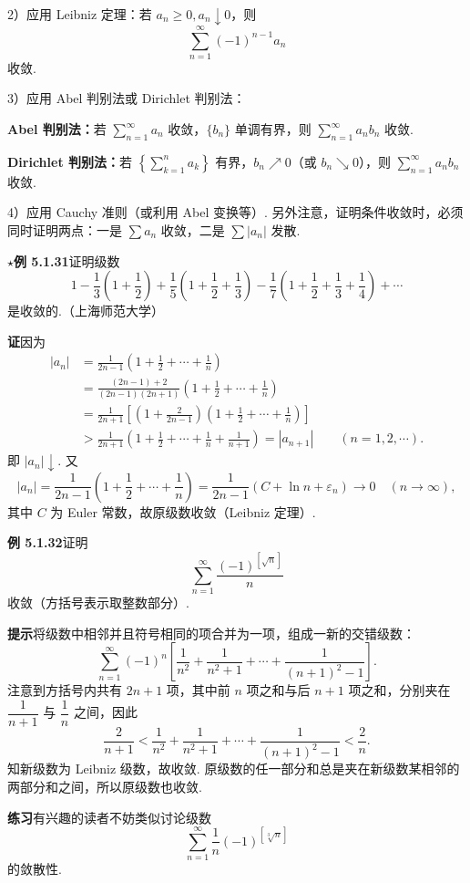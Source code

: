 \documentclass[UTF8,12pt,a4paper,fontset=fandol]{ctexart}
\begin{document}
2）应用 Leibniz 定理：若 $a_n\ge0,a_n\downarrow0$，则
\[
  \sum_{n=1}^\infty(-1)^{n-1}a_n
\]
收敛.

3）应用 Abel 判别法或 Dirichlet 判别法：

\noindent\textbf{Abel 判别法：}若 $\displaystyle\sum_{n=1}^\infty a_n$ 收敛，$\{b_n\}$ 单调有界，则 $\displaystyle\sum_{n=1}^\infty a_nb_n$ 收敛.

\noindent\textbf{Dirichlet 判别法：}若 $\left\{\displaystyle\sum_{k=1}^n a_k\right\}$ 有界，$b_n\nearrow0$（或 $b_n\searrow0$），则 $\displaystyle\sum_{n=1}^\infty a_nb_n$ 收敛.

4）应用 Cauchy 准则（或利用 Abel 变换等）. 另外注意，证明条件收敛时，必须同时证明两点：一是 $\sum a_n$ 收敛，二是 $\sum |a_n|$ 发散.

\noindent\textbf{$\star$例 5.1.31}\quad 证明级数
\[
  1-\frac13\left(1+\frac12\right)
  +\frac15\left(1+\frac12+\frac13\right)
  -\frac17\left(1+\frac12+\frac13+\frac14\right)+\cdots
\]
是收敛的.（上海师范大学）

\noindent\textbf{证}\quad 因为
\[
\begin{aligned}
|a_n|
&=\frac1{2n-1}\left(1+\frac12+\cdots+\frac1n\right)\\
&=\frac{(2n-1)+2}{(2n-1)(2n+1)}
  \left(1+\frac12+\cdots+\frac1n\right)\\
&=\frac1{2n+1}\left[\left(1+\frac2{2n-1}\right)
  \left(1+\frac12+\cdots+\frac1n\right)\right]\\
&>\frac1{2n+1}\left(1+\frac12+\cdots+\frac1n+\frac1{n+1}\right)
=|a_{n+1}|\qquad(n=1,2,\cdots).
\end{aligned}
\]
即 $|a_n|\downarrow$. 又
\[
  |a_n|=\frac1{2n-1}\left(1+\frac12+\cdots+\frac1n\right)
  =\frac1{2n-1}(C+\ln n+\varepsilon_n)\to0\quad(n\to\infty),
\]
其中 $C$ 为 Euler 常数，故原级数收敛（Leibniz 定理）.

\noindent\textbf{例 5.1.32}\quad 证明
\[
  \sum_{n=1}^{\infty}\frac{(-1)^{[\sqrt n]}}n
\]
收敛（方括号表示取整数部分）.

\noindent\textbf{提示}\quad 将级数中相邻并且符号相同的项合并为一项，组成一新的交错级数：
\[
  \sum_{n=1}^{\infty}(-1)^n
  \left[\frac1{n^2}+\frac1{n^2+1}+\cdots+\frac1{(n+1)^2-1}\right].
\]
注意到方括号内共有 $2n+1$ 项，其中前 $n$ 项之和与后 $n+1$ 项之和，分别夹在 $\dfrac1{n+1}$ 与 $\dfrac1n$ 之间，因此
\[
  \frac2{n+1}<\frac1{n^2}+\frac1{n^2+1}
  +\cdots+\frac1{(n+1)^2-1}<\frac2n.
\]
知新级数为 Leibniz 级数，故收敛. 原级数的任一部分和总是夹在新级数某相邻的两部分和之间，所以原级数也收敛.

\noindent\textbf{练习}\quad 有兴趣的读者不妨类似讨论级数
\[
  \sum_{n=1}^{\infty}\frac1n(-1)^{[\sqrt[3]n]}
\]
的敛散性.
\end{document}
